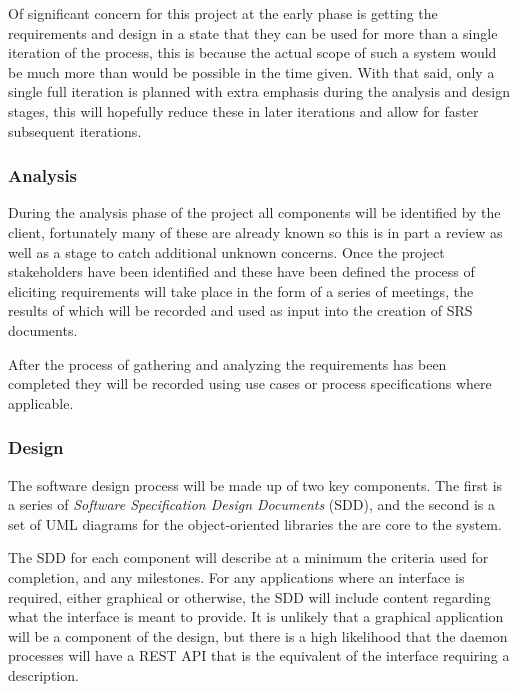 \documentclass[11pt]{article}
\begin{document}
        Of significant concern for this project at the early phase is getting the
        requirements and design in a state that they can be used for more than a
        single iteration of the process, this is because the actual scope of such
        a system would be much more than would be possible in the time given.
        With that said, only a single full iteration is planned with extra
        emphasis during the analysis and design stages, this will hopefully
        reduce these in later iterations and allow for faster subsequent
        iterations.

        \subsubsection{Analysis}\label{sec:soln-model-analysis}

          During the analysis phase of the project all components will be
          identified by the client, fortunately many of these are already known
          so this is in part a review as well as a stage to catch additional unknown
          concerns. Once the project stakeholders have been identified and these
          have been defined the process of eliciting requirements will take place
          in the form of a series of meetings, the results of which will be
          recorded and used as input into the creation of SRS documents.

          After the process of gathering and analyzing the requirements has been
          completed they will be recorded using use cases or process
          specifications where applicable.

        \subsubsection{Design}\label{sec:soln-model-design}

          The software design process will be made up of two key components. The
          first is a series of \emph{Software Specification Design Documents}
          (SDD), and the second is a set of UML diagrams for the object-oriented
          libraries the are core to the system.

          The SDD for each component will describe at a minimum the criteria used
          for completion, and any milestones. For any applications where an
          interface is required, either graphical or otherwise, the SDD will
          include content regarding what the interface is meant to provide. It is
          unlikely that a graphical application will be a component of the design,
          but there is a high likelihood that the daemon processes will have a
          REST API that is the equivalent of the interface requiring a
          description.
\end{document}

